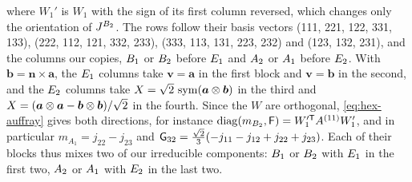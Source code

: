where $W_1'$ is $W_1$ with the sign of its first column reversed, which changes only the
orientation of $J_{}^{B_2}$. The rows follow their basis
vectors (111, 221, 122, 331, 133), (222, 112, 121, 332, 233), (333, 113, 131, 223, 232)
and (123, 132, 231), and the columns our copies, $B_1$ or $B_2$ before
$E_1$ and $A_2$ or $A_1$ before $E_2$. With $\bm b=\bm n\times\bm a$,
the $E_1$ columns take $\bm v=\bm a$ in the first block and $\bm v=\bm b$ in the
second, and the $E_2$ columns take $X=\sqrt2\,\operatorname{sym}(\bm a\otimes\bm b)$ in the third and
$X=(\bm a\otimes\bm a-\bm b\otimes\bm b)/\sqrt2$ in the fourth. Since the $W$ are
orthogonal, \eqref{eq:hex-auffray} gives both directions, for instance
$\mathrm{diag}(m_{B_2},\mathsf{F})=W_1'^{\mathsf T}A^{(11)}W_1'$, and in particular $m_{A_1}=j_{22}-j_{23}$ and $\mathsf{G}_{32}=\tfrac{\sqrt2}{3}(-j_{11}-j_{12}+j_{22}
+j_{23})$. Each of their blocks thus mixes two of our irreducible components:
$B_1$ or $B_2$ with $E_1$ in the first two, $A_2$ or
$A_1$ with $E_2$ in the last two.
